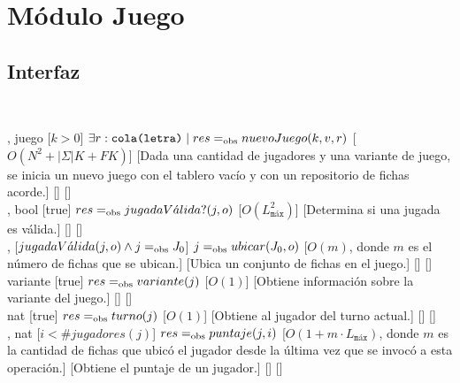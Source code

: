 \section{Módulo Juego}
\begin{interfaz}{\subsection{Interfaz}}
  \\
  \usa{\falta}
  \par\noindent
  \begin{operaciones}
    {
      ,
    }{juego}
    [$k>0$]
    {$\exists r: \texttt{cola(letra)} \mid res =_{\mathrm{obs}} nuevoJuego(k,v,r)$}
    [$O(N^{2}+|\Sigma|K+FK)$]
    [Dada una cantidad de jugadores y una variante de juego, se inicia un nuevo juego con el tablero vacío y con un repositorio de fichas acorde.]
    [\falta]
    [\falta]\\

    \noindent{}
    {
      ,
    }{bool}
    [true]
    {$res=_{\mathrm{obs}} jugadaV\acute{a}lida?(j,o)$}
    [$O(L_{\texttt{máx}}^{2})$]
    [Determina si una jugada es válida.]
    [\falta]
    [\falta]\\

    \noindent{}
    {
      ,
    }{}
    [$jugadaV\acute{a}lida(j,o) \land j=_{\mathrm{obs}} J_{0} $]
    {$j=_{\mathrm{obs}} ubicar(J_{0},o)$}
    [$O(m)$, donde $m$ es el número de fichas que se ubican.]
    [Ubica un conjunto de fichas en el juego.]
    [\falta]
    [\falta]\\

    \noindent{}
    {
    }{variante}
    [true]
    {$res=_{\mathrm{obs}} variante(j)$}
    [$O(1)$]
    [Obtiene información sobre la variante del juego.]
    [\falta]
    [\falta]\\

    \noindent{}
    {
    }{nat}
    [true]
    {$res=_{\mathrm{obs}} turno(j)$}
    [$O(1)$]
    [Obtiene al jugador del turno actual.]
    [\falta]
    [\falta]\\

    \noindent{}
    {
      ,
    }{nat}
    [$i < \#jugadores(j)$]
    {$res=_{\mathrm{obs}} puntaje(j,i)$}
    [$O(1+m\cdot L_{\texttt{máx}})$, donde $m$ es la cantidad de fichas que ubicó el
jugador desde la última vez que se invocó a esta operación.]
    [Obtiene el puntaje de un jugador.]
    [\falta]
    [\falta]\\


\end{operaciones}
\end{interfaz}
